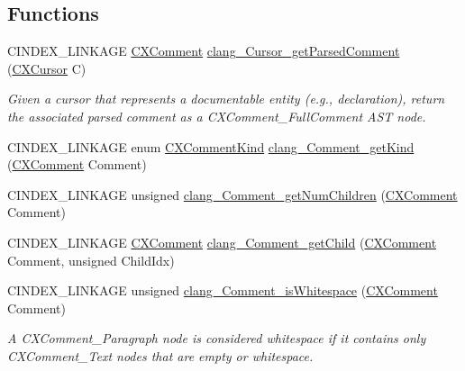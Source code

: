 \subsection*{Functions}
\begin{DoxyCompactItemize}
\item 
\mbox{\label{group__CINDEX__COMMENT_gab4f95ae3b2e0bd63b10cecc3727a391e}} 
C\+I\+N\+D\+E\+X\+\_\+\+L\+I\+N\+K\+A\+GE \hyperlink{structCXComment}{C\+X\+Comment} \hyperlink{group__CINDEX__COMMENT_gab4f95ae3b2e0bd63b10cecc3727a391e}{clang\+\_\+\+Cursor\+\_\+get\+Parsed\+Comment} (\hyperlink{structCXCursor}{C\+X\+Cursor} C)
\begin{DoxyCompactList}\small\item\em Given a cursor that represents a documentable entity (e.\+g., declaration), return the associated parsed comment as a {\ttfamily C\+X\+Comment\+\_\+\+Full\+Comment} A\+ST node. \end{DoxyCompactList}\item 
C\+I\+N\+D\+E\+X\+\_\+\+L\+I\+N\+K\+A\+GE enum \hyperlink{group__CINDEX__COMMENT_ga3c336d80551401fde394b84aa5651221}{C\+X\+Comment\+Kind} \hyperlink{group__CINDEX__COMMENT_gad7f2a27ab2f69abcb9442e05a21a130f}{clang\+\_\+\+Comment\+\_\+get\+Kind} (\hyperlink{structCXComment}{C\+X\+Comment} Comment)
\item 
C\+I\+N\+D\+E\+X\+\_\+\+L\+I\+N\+K\+A\+GE unsigned \hyperlink{group__CINDEX__COMMENT_gaad4eba69493735a4db462bb4b5bed97a}{clang\+\_\+\+Comment\+\_\+get\+Num\+Children} (\hyperlink{structCXComment}{C\+X\+Comment} Comment)
\item 
C\+I\+N\+D\+E\+X\+\_\+\+L\+I\+N\+K\+A\+GE \hyperlink{structCXComment}{C\+X\+Comment} \hyperlink{group__CINDEX__COMMENT_gad5567ecc26b083562e42b83170c105aa}{clang\+\_\+\+Comment\+\_\+get\+Child} (\hyperlink{structCXComment}{C\+X\+Comment} Comment, unsigned Child\+Idx)
\item 
C\+I\+N\+D\+E\+X\+\_\+\+L\+I\+N\+K\+A\+GE unsigned \hyperlink{group__CINDEX__COMMENT_ga1193c1dc798aecad92cb30cea78bf71e}{clang\+\_\+\+Comment\+\_\+is\+Whitespace} (\hyperlink{structCXComment}{C\+X\+Comment} Comment)
\begin{DoxyCompactList}\small\item\em A {\ttfamily C\+X\+Comment\+\_\+\+Paragraph} node is considered whitespace if it contains only {\ttfamily C\+X\+Comment\+\_\+\+Text} nodes that are empty or whitespace. \end{DoxyCompactList}\item 

\end{DoxyCompactItemize}
